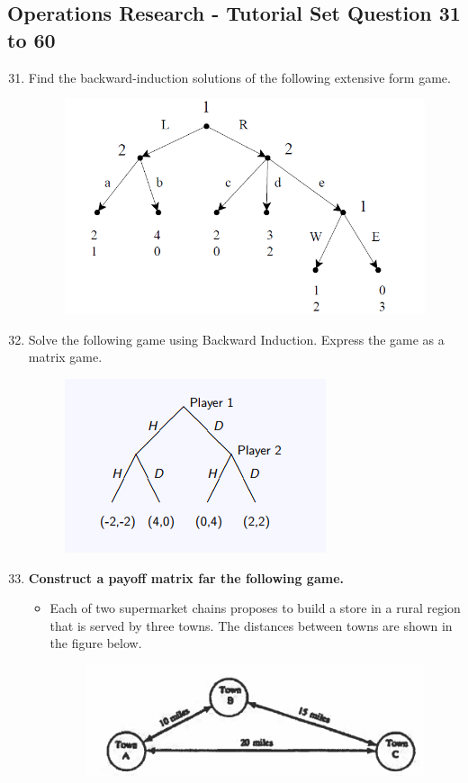 \documentclass[]{report}
\begin{document}
\subsection*{Operations Research - Tutorial Set Question 31 to 60}
\begin{enumerate}
	\setcounter{enumi}{30}

\item 
Find the backward-induction solutions of the following extensive form game.
\begin{figure}[h!]
	\centering
	\includegraphics[width=0.45\linewidth]{Q31}
	
\end{figure}



\item Solve the following game using Backward Induction. Express the game as a matrix game.

\begin{figure}[h!]
	\centering
	\includegraphics[width=0.4\linewidth]{Q32}
	
\end{figure}


\item \textbf{Construct a payoff matrix far the following game.}\\

\begin{itemize}
	\item Each of two supermarket chains proposes to 
	build a store in a rural region that is served by three towns. The distances between towns are 
	shown in the figure below.\begin{figure}[h!]
		\centering
		\includegraphics[width=0.45\linewidth]{Q35}
	\end{figure}
	

\end{itemize}
\end{enumerate}
\end{document}
